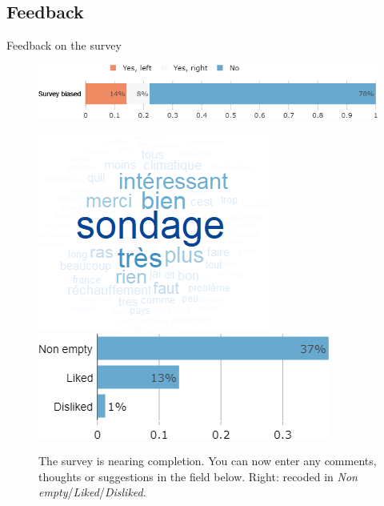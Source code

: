 \begin{framefont}{\small}
\subsection{Feedback}
\begin{frame}{Feedback on the survey}%
\vspace{-.2cm}
\begin{figure}[h!]
\caption{Do you feel that this survey was politically biased?}
\includegraphics[width=.52\paperwidth]{../figures/FR/survey_biased_FR.png} \\
\vspace{.2cm}
\caption{The survey is nearing completion. You can now enter any comments, thoughts or suggestions in the field below. Right: recoded in \textit{Non empty}/\textit{Liked}/\textit{Disliked}.}
\includegraphics[width=.26\paperwidth]{../figures/FR/comment_field_FR.png}
\vspace{.2cm}
\includegraphics[width=.4\paperwidth]{../figures/FR/comment_field_mentions_FR.png}
\end{figure}
\end{frame}


\end{framefont}
